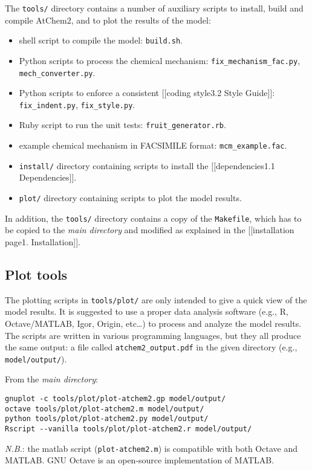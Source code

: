 The \texttt{tools/} directory contains a number of auxiliary scripts to
install, build and compile AtChem2, and to plot the results of the
model:

\begin{itemize}
\tightlist
\item
  shell script to compile the model: \texttt{build.sh}.
\item
  Python scripts to process the chemical mechanism:
  \texttt{fix\_mechanism\_fac.py}, \texttt{mech\_converter.py}.
\item
  Python scripts to enforce a consistent {[}{[}coding style\textbar{}3.2
  Style Guide{]}{]}: \texttt{fix\_indent.py}, \texttt{fix\_style.py}.
\item
  Ruby script to run the unit tests: \texttt{fruit\_generator.rb}.
\item
  example chemical mechanism in FACSIMILE format:
  \texttt{mcm\_example.fac}.
\item
  \texttt{install/} directory containing scripts to install the
  {[}{[}dependencies\textbar{}1.1 Dependencies{]}{]}.
\item
  \texttt{plot/} directory containing scripts to plot the model results.
\end{itemize}

In addition, the \texttt{tools/} directory contains a copy of the
\texttt{Makefile}, which has to be copied to the \emph{main directory}
and modified as explained in the {[}{[}installation page\textbar{}1.
Installation{]}{]}.

\hypertarget{plot-tools}{%
\subsection{Plot tools}\label{plot-tools}}

The plotting scripts in \texttt{tools/plot/} are only intended to give a
quick view of the model results. It is suggested to use a proper data
analysis software (e.g., R, Octave/MATLAB, Igor, Origin, etc\ldots{}) to
process and analyze the model results. The scripts are written in
various programming languages, but they all produce the same output: a
file called \texttt{atchem2\_output.pdf} in the given directory (e.g.,
\texttt{model/output/}).

From the \emph{main directory}:

\begin{verbatim}
gnuplot -c tools/plot/plot-atchem2.gp model/output/
octave tools/plot/plot-atchem2.m model/output/
python tools/plot/plot-atchem2.py model/output/
Rscript --vanilla tools/plot/plot-atchem2.r model/output/
\end{verbatim}

\emph{N.B.}: the matlab script (\texttt{plot-atchem2.m}) is compatible
with both Octave and MATLAB. GNU Octave is an open-source implementation
of MATLAB.
